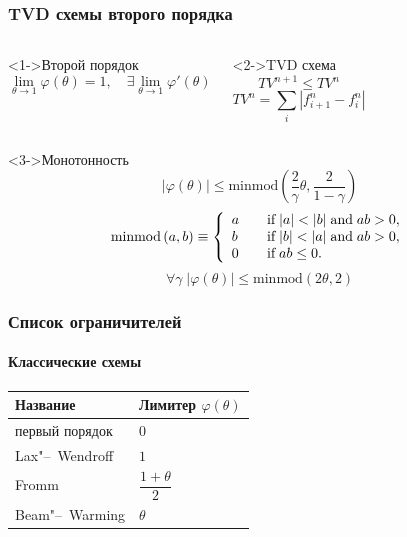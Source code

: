 \documentclass[ucs]{beamer}
\begin{document}
\begin{frame}
	\frametitle{TVD схемы второго порядка}
	\begin{columns}
		\begin{block}<1->{Второй порядок}
			\[ \lim_{\theta\to1}{\varphi(\theta)} = 1, \quad \exists \lim_{\theta\to1}{\varphi'(\theta)} \]
		\end{block}
		\begin{block}<2->{TVD схема}
			\[ TV^{n+1}\le TV^n \]
			\[ TV^n = \sum_i| f_{i+1}^n - f_i^n | \]
		\end{block}
	\end{columns}
		\begin{block}<3->{Монотонность}
			\[ |\varphi(\theta)| \leq \mathrm{minmod}\left(\frac2{\gamma}\theta,\frac2{1-\gamma}\right) \]
			\[
			\mathrm{minmod}\,(a,b) \equiv \left\{
			\begin{array}{l l}
				a & \quad \text{if}\;|a|<|b| \;\text{and}\;ab>0, \\
				b & \quad \text{if}\;|b|<|a| \;\text{and}\;ab>0, \\
				0 & \quad \text{if}\;ab \leq 0.
			\end{array}\right.
			\]
			\[ \forall \gamma \; |\varphi(\theta)| \leq \mathrm{minmod}\left(2\theta,2\right) \]
		\end{block}
\end{frame}

\begin{frame}
	\frametitle{Список ограничителей}
	\framesubtitle{Классические схемы}
	\renewcommand\arraystretch{1.5}
	\begin{table}
		\begin{tabular}{>{\centering}p{3cm}|>{\centering}p{3cm}}
			\toprule
			Название		&  Лимитер \( \varphi(\theta) \) \tabularnewline
			\midrule
			первый порядок	& \( 0 \) \tabularnewline
			Lax"--~Wendroff	& \( 1 \) \tabularnewline
			Fromm			& \( \dfrac{1+\theta}2 \) \tabularnewline
			Beam"--~Warming	& \( \theta \) \tabularnewline
			\bottomrule
		\end{tabular}
	\end{table}
\end{frame}
\end{document}
